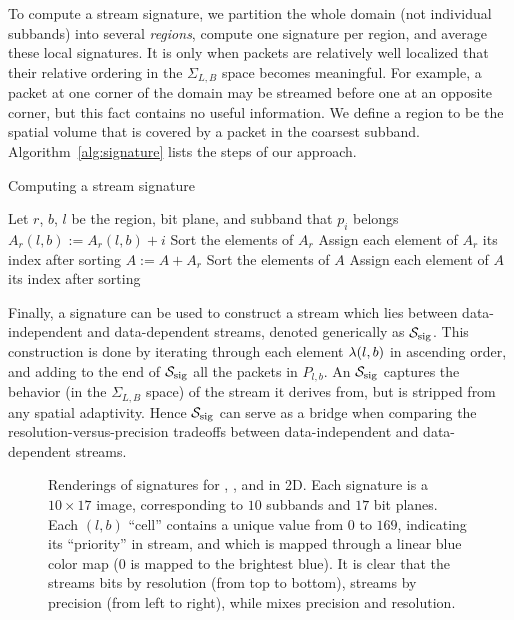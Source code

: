 To compute a stream signature, we partition the whole domain (not individual subbands) into several
\emph{regions}, compute one signature per region, and average these local signatures. It is only
when packets are relatively well localized that their relative ordering in the $\Sigma_{L,B}$ space
becomes meaningful. For example, a packet at one corner of the domain may be streamed before one at
an opposite corner, but this fact contains no useful information. We define a region to be the
spatial volume that is covered by a packet in the coarsest subband. Algorithm~\ref{alg:signature}
lists the steps of our approach.

\begin{algorithm}[h]
  \caption{Computing a stream signature}
  \begin{algorithmic}[1]
			\State Let $r$, $b$, $l$ be the region, bit plane, and subband that $p_i$ belongs
			\State $A_r(l,b) := A_r(l,b)+i$
		\EndFor
			\State Sort the elements of $A_r$
			\State Assign each element of $A_r$ its index after sorting
			\State $A := A+A_r$
		\EndFor
		\State Sort the elements of $A$
		\State Assign each element of $A$ its index after sorting
	\end{algorithmic}
	\label{alg:signature}
\end{algorithm}

Finally, a signature can be used to construct a stream which lies between data-independent and
data-dependent streams, denoted generically as $\ssig$. This construction is done by iterating
through each element $\sgn(l,b)$ in ascending order, and adding to the end of $\ssig$ all the
packets in $P_{l,b}$. An $\ssig$ captures the behavior (in the $\Sigma_{L,B}$ space) of the stream
it derives from, but is stripped from any spatial adaptivity. Hence $\ssig$ can serve as a bridge
when comparing the resolution-versus-precision tradeoffs between data-independent and data-dependent
streams.

\begin{figure}[t]
\centering
\caption{Renderings of signatures for \slvl, \sbit, and \swav in 2D. Each signature is a $10\times
17$ image, corresponding to $10$ subbands and $17$ bit planes. Each $(l,b)$ ``cell'' contains a
unique value from $0$ to $169$, indicating its ``priority'' in stream, and which is mapped through a
linear blue color map ($0$ is mapped to the brightest blue). It is clear that the \slvl streams bits
by resolution (from top to bottom), \sbit streams by precision (from left to right), while \swav
mixes precision and resolution.}
\label{fig:example-signatures}
\end{figure}
